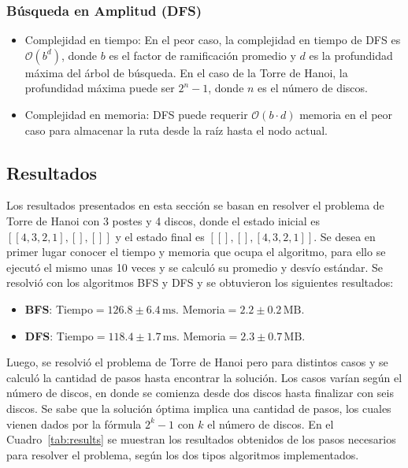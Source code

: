 \documentclass[a4paper,11pt]{article}
\begin{document}
\subsubsection{Búsqueda en Amplitud (DFS)}
\begin{itemize}
    \item Complejidad en tiempo: En el peor caso, la complejidad en tiempo de DFS es $\mathcal{O}(b^d)$, donde $b$ es el factor de ramificación promedio y $d$ es la profundidad máxima del árbol de búsqueda. En el caso de la Torre de Hanoi, la profundidad máxima puede ser $2^n-1$, donde $n$ es el número de discos.
    \item Complejidad en memoria: DFS puede requerir $\mathcal{O}(b\cdot d)$ memoria en el peor caso para almacenar la ruta desde la raíz hasta el nodo actual.
\end{itemize}

\subsection{Resultados}
Los resultados presentados en esta sección se basan en resolver el problema de Torre de Hanoi con 3 postes y 4 discos, donde el estado inicial es $[[4,3,2,1],[],[]]$ y el estado final es $[[],[],[4,3,2,1]]$. Se desea en primer lugar conocer el tiempo y memoria que ocupa el algoritmo, para ello se ejecutó el mismo unas 10 veces y se calculó su promedio y desvío estándar. Se resolvió con los algoritmos BFS y DFS y se obtuvieron los siguientes resultados:
\begin{itemize}
    \item \textbf{BFS}: Tiempo$=126.8\pm 6.4\,\mathrm{ms}$. Memoria$=2.2\pm 0.2\,\mathrm{MB}$.
    \item \textbf{DFS}: Tiempo$=118.4\pm 1.7\,\mathrm{ms}$. Memoria$=2.3\pm 0.7\,\mathrm{MB}$.
\end{itemize}
Luego, se resolvió el problema de Torre de Hanoi pero para distintos casos y se calculó la cantidad de pasos hasta encontrar la solución. Los casos varían según el número de discos, en donde se comienza desde dos discos hasta finalizar con seis discos. Se sabe que la solución óptima implica una cantidad de pasos, los cuales vienen dados por la fórmula $2^k-1$ con $k$ el número de discos. En el Cuadro~\ref{tab:results} se muestran los resultados obtenidos de los pasos necesarios para resolver el problema, según los dos tipos algoritmos implementados.
\end{document}
